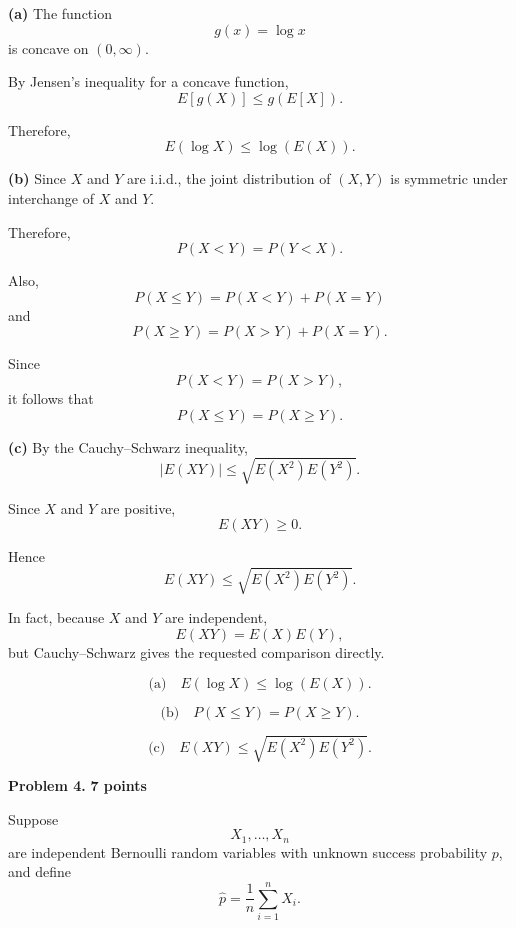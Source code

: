 \documentclass[11pt]{article}
\begin{document}
\begin{solutionbox}

\textbf{(a)} The function
\[
g(x)=\log x
\]
is concave on \((0,\infty)\).

By Jensen's inequality for a concave function,
\[
E[g(X)]\leq g(E[X]).
\]

Therefore,
\[
E(\log X)\leq\log(E(X)).
\]


\textbf{(b)} Since \(X\) and \(Y\) are i.i.d., the joint distribution of
\((X,Y)\) is symmetric under interchange of \(X\) and \(Y\).

Therefore,
\[
P(X<Y)=P(Y<X).
\]

Also,
\[
P(X\leq Y)
=
P(X<Y)+P(X=Y)
\]
and
\[
P(X\geq Y)
=
P(X>Y)+P(X=Y).
\]

Since
\[
P(X<Y)=P(X>Y),
\]
it follows that
\[
P(X\leq Y)=P(X\geq Y).
\]


\textbf{(c)} By the Cauchy--Schwarz inequality,
\[
|E(XY)|
\leq
\sqrt{E(X^2)E(Y^2)}.
\]

Since \(X\) and \(Y\) are positive,
\[
E(XY)\geq0.
\]

Hence
\[
E(XY)
\leq
\sqrt{E(X^2)E(Y^2)}.
\]

In fact, because \(X\) and \(Y\) are independent,
\[
E(XY)=E(X)E(Y),
\]
but Cauchy--Schwarz gives the requested comparison directly.

\begin{finalanswerbox}

\[
\text{(a)}\quad
E(\log X)
\leq
\log(E(X)).
\]

\[
\text{(b)}\quad
P(X\leq Y)
=
P(X\geq Y).
\]

\[
\text{(c)}\quad
E(XY)
\leq
\sqrt{E(X^2)E(Y^2)}.
\]

\end{finalanswerbox}

\end{solutionbox}


\newpage


\begin{problemheader}
\textbf{Problem 4.} \hfill \textbf{7 points}
\end{problemheader}

Suppose
\[
X_1,\ldots,X_n
\]
are independent Bernoulli random variables with unknown success probability
\(p\), and define
\[
\widehat p
=
\frac1n\sum_{i=1}^n X_i.
\]
\end{document}

